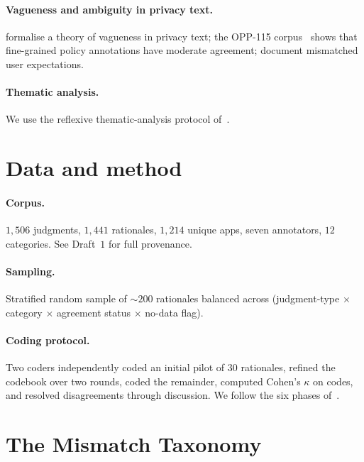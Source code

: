\documentclass[11pt,a4paper]{article}
\begin{document}
\paragraph{Vagueness and ambiguity in privacy text.}
\citet{bhatia2016theory} formalise a theory of vagueness in privacy
text; the OPP-115 corpus~\citep{wilson2016creation} shows that
fine-grained policy annotations have moderate agreement;
\citet{rao2016expecting} document mismatched user expectations.
\paragraph{Thematic analysis.}
We use the reflexive thematic-analysis protocol
of~\citet{braun2006using}.

\section{Data and method}\label{sec:data}
\paragraph{Corpus.} $1{,}506$ judgments, $1{,}441$ rationales,
$1{,}214$ unique apps, seven annotators, $12$ categories. See Draft~$1$
for full provenance.
\paragraph{Sampling.} Stratified random sample of $\sim 200$ rationales
balanced across (judgment-type $\times$ category $\times$ agreement
status $\times$ no-data flag).
\paragraph{Coding protocol.} Two coders independently coded an initial
pilot of $30$ rationales, refined the codebook over two rounds, coded
the remainder, computed Cohen's $\kappa$ on codes, and resolved
disagreements through discussion. We follow the six phases
of~\citet{braun2006using}.

\section{The Mismatch Taxonomy}\label{sec:taxonomy}
\end{document}
